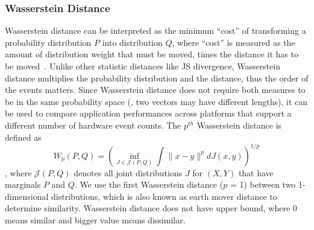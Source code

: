 \subsubsection{Wasserstein Distance}
\label{sec:wass}
Wasserstein distance\cite{rubner2000earth} can be interpreted as the minimum ``cost'' of transforming a probability distribution $P$ into distribution $Q$, where ``cost'' is measured as the amount of distribution weight that must be moved, times the distance it has to be moved~\cite{wassersteinscipy}. 
Unlike other statistic distances like JS divergence, Wasserstein distance multiplies the probability distribution and the distance, thus the order of the events matters. 
Since Wasserstein distance does not require both measures to be in the same probability space (\ie, two vectors may have different lengths), it can be used to compare application performances across platforms that support a different number of hardware event counts. The $p^{th}$ Wasserstein distance is defined as 
\begin{equation}
W_{p}(P, Q)=\left(\inf _{J \in \mathcal{J}(P, Q)} \int\|x-y\|^{p} d J(x, y)\right)^{1 / p}
\end{equation},
where $\mathcal{J}(P, Q)$ denotes all joint distributions $J$ for $(X,Y)$ that have marginals $P$ and $Q$. 
We use the first Wasserstein distance ($p$ = 1) between two 1-dimensional distributions, which is also known as earth mover distance to determine similarity. Wasserstein distance does not have upper bound, where 0 means similar and bigger value means dissimilar.

